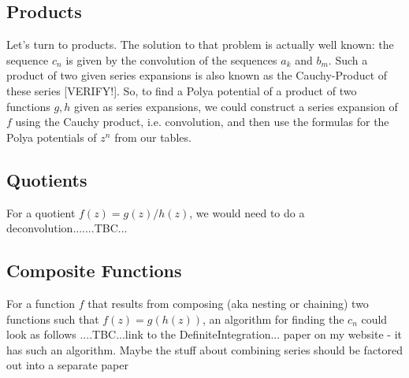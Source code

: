 \documentclass[12pt]{article}
\begin{document}
\subsection{Products}
Let's turn to products. The solution to that problem is actually well known: the sequence $c_n$ is given by the convolution of the sequences $a_k$ and $b_m$. Such a product of two given series expansions is also known as the Cauchy-Product of these series [VERIFY!]. So, to find a Polya potential of a product of two functions $g,h$ given as series expansions, we could construct a series expansion of $f$ using the Cauchy product, i.e. convolution, and then use the formulas for the Polya potentials of $z^n$ from our tables. 

\subsection{Quotients}
For a quotient $f(z) = g(z) / h(z)$, we would need to do a deconvolution.......TBC...

\subsection{Composite Functions}
For a function $f$ that results from composing (aka nesting or chaining) two functions such that $f(z) = g(h(z))$, an algorithm for finding the $c_n$ could look as follows ....TBC...link to the DefiniteIntegration... paper on my website - it has such an algorithm. Maybe the stuff about combining series should be factored out into a separate paper 




\end{document}
